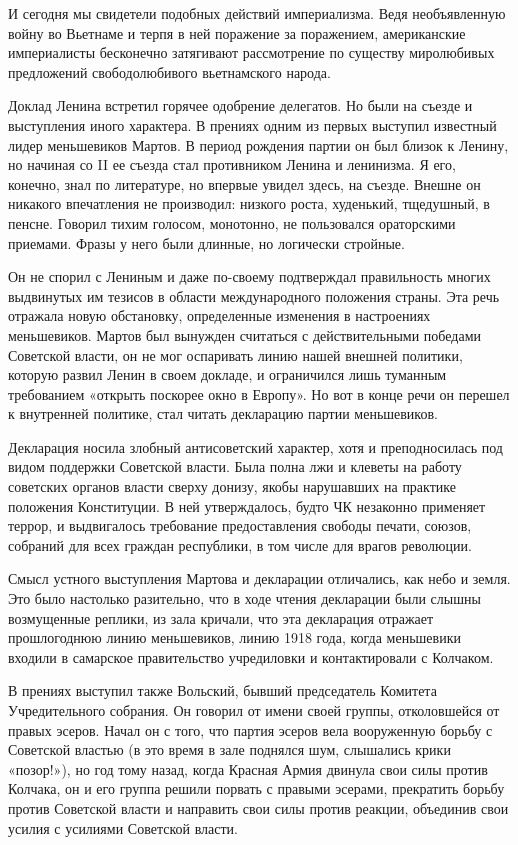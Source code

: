 \documentclass[12pt, a4paper, openany]{book}
\begin{document}
И сегодня мы свидетели подобных действий империализма. Ведя необъявленную войну во Вьетнаме и терпя в ней поражение за поражением, американские империалисты бесконечно затягивают рассмотрение по существу миролюбивых предложений свободолюбивого вьетнамского народа.

Доклад Ленина встретил горячее одобрение делегатов. Но были на съезде и выступления иного характера. В прениях одним из первых выступил известный лидер меньшевиков Мартов. В период рождения партии он был близок к Ленину, но начиная со II ее съезда стал противником Ленина и ленинизма. Я его, конечно, знал по литературе, но впервые увидел здесь, на съезде. Внешне он никакого впечатления не производил: низкого роста, худенький, тщедушный, в пенсне. Говорил тихим голосом, монотонно, не пользовался ораторскими приемами. Фразы у него были длинные, но логически стройные.

Он не спорил с Лениным и даже по-своему подтверждал правильность многих выдвинутых им тезисов в области международного положения страны. Эта речь отражала новую обстановку, определенные изменения в настроениях меньшевиков. Мартов был вынужден считаться с действительными победами Советской власти, он не мог оспаривать линию нашей внешней политики, которую развил Ленин в своем докладе, и ограничился лишь туманным требованием «открыть поскорее окно в Европу». Но вот в конце речи он перешел к внутренней политике, стал читать декларацию партии меньшевиков.

Декларация носила злобный антисоветский характер, хотя и преподносилась под видом поддержки Советской власти. Была полна лжи и клеветы на работу советских органов власти сверху донизу, якобы нарушавших на практике положения Конституции. В ней утверждалось, будто ЧК незаконно применяет террор, и выдвигалось требование предоставления свободы печати, союзов, собраний для всех граждан республики, в том числе для врагов революции.

Смысл устного выступления Мартова и декларации отличались, как небо и земля. Это было настолько разительно, что в ходе чтения декларации были слышны возмущенные реплики, из зала кричали, что эта декларация отражает прошлогоднюю линию меньшевиков, линию 1918 года, когда меньшевики входили в самарское правительство учредиловки и контактировали с Колчаком.

В прениях выступил также Вольский, бывший председатель Комитета Учредительного собрания. Он говорил от имени своей группы, отколовшейся от правых эсеров. Начал он с того, что партия эсеров вела вооруженную борьбу с Советской властью (в это время в зале поднялся шум, слышались крики «позор!»), но год тому назад, когда Красная Армия двинула свои силы против Колчака, он и его группа решили порвать с правыми эсерами, прекратить борьбу против Советской власти и направить свои силы против реакции, объединив свои усилия с усилиями Советской власти.
\end{document}
